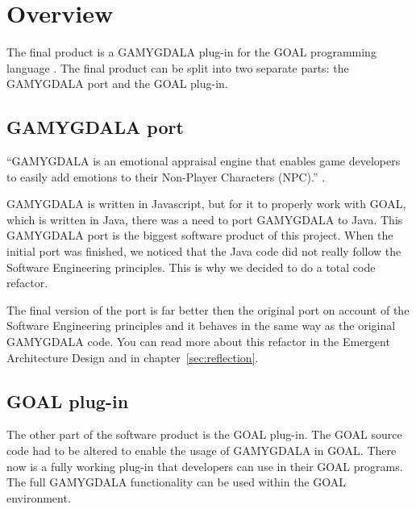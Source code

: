 \section{Overview}
The final product is a GAMYGDALA \citep{gamygdala} plug-in for the GOAL programming language \citep{goal}. The final product can be split into two separate parts: the GAMYGDALA port and the GOAL plug-in.

\subsection{GAMYGDALA port}
``GAMYGDALA is an emotional appraisal engine that enables game developers to easily add emotions to their Non-Player Characters (NPC).'' \citep{gamygdala}. \par
GAMYGDALA is written in Javascript, but for it to properly work with GOAL, which is written in Java, there was a need to port GAMYGDALA to Java. This GAMYGDALA port is the biggest software product of this project. When the initial port was finished, we noticed that the Java code did not really follow the Software Engineering principles. This is why we decided to do a total code refactor. \par 
The final version of the port is far better then the original port on account of the Software Engineering principles and it behaves in the same way as the original GAMYGDALA code. You can read more about this refactor in the Emergent Architecture Design \citep{ead} and in chapter~\ref{sec:reflection}.

\subsection{GOAL plug-in}
The other part of the software product is the GOAL plug-in. The GOAL source code had to be altered to enable the usage of GAMYGDALA in GOAL. There now is a fully working plug-in that developers can use in their GOAL programs. The full GAMYGDALA functionality can be used within the GOAL environment.